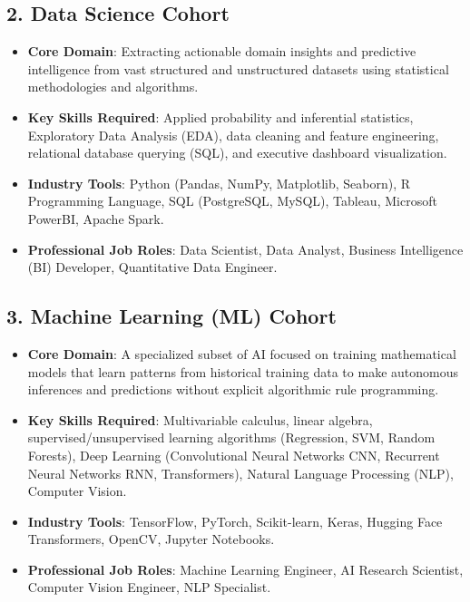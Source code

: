\subsection{2. Data Science Cohort}
\begin{itemize}[leftmargin=1.5em]
    \item \textbf{Core Domain}: Extracting actionable domain insights and predictive intelligence from vast structured and unstructured datasets using statistical methodologies and algorithms.
    \item \textbf{Key Skills Required}: Applied probability and inferential statistics, Exploratory Data Analysis (EDA), data cleaning and feature engineering, relational database querying (SQL), and executive dashboard visualization.
    \item \textbf{Industry Tools}: Python (Pandas, NumPy, Matplotlib, Seaborn), R Programming Language, SQL (PostgreSQL, MySQL), Tableau, Microsoft PowerBI, Apache Spark.
    \item \textbf{Professional Job Roles}: Data Scientist, Data Analyst, Business Intelligence (BI) Developer, Quantitative Data Engineer.
\end{itemize}

\subsection{3. Machine Learning (ML) Cohort}
\begin{itemize}[leftmargin=1.5em]
    \item \textbf{Core Domain}: A specialized subset of AI focused on training mathematical models that learn patterns from historical training data to make autonomous inferences and predictions without explicit algorithmic rule programming.
    \item \textbf{Key Skills Required}: Multivariable calculus, linear algebra, supervised/unsupervised learning algorithms (Regression, SVM, Random Forests), Deep Learning (Convolutional Neural Networks CNN, Recurrent Neural Networks RNN, Transformers), Natural Language Processing (NLP), Computer Vision.
    \item \textbf{Industry Tools}: TensorFlow, PyTorch, Scikit-learn, Keras, Hugging Face Transformers, OpenCV, Jupyter Notebooks.
    \item \textbf{Professional Job Roles}: Machine Learning Engineer, AI Research Scientist, Computer Vision Engineer, NLP Specialist.
\end{itemize}

